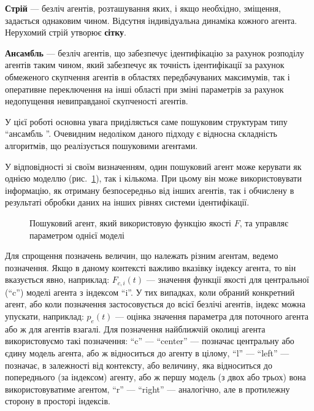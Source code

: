 \documentclass[a4paper,13pt]{atuaref}
\begin{document}
\textbf{Стрій} --- безліч агентів, розташування яких, і якщо необхідно,
зміщення, задається однаковим чином. Відсутня індивідуальна динаміка кожного
агента. Нерухомий стрій утворює \textbf{сітку}.

\textbf {Ансамбль} ---
безліч агентів, що забезпечує ідентифікацію за рахунок розподілу агентів таким
чином, який забезпечує як точність ідентифікації за рахунок обмеженого
скупчення агентів в областях передбачуваних максимумів, так і оперативне
переключення на інші області при зміні параметрів за рахунок недопущення
невиправданої скупченості агентів.

У цієї роботі основна увага приділяється саме пошуковим структурам типу
``ансамбль ''. Очевидним недоліком даного підходу є відносна складність
алгоритмів, що реалізується пошуковими агентами.

У відповідності зі своїм визначенням, один пошуковий агент може керувати як
однією моделлю (рис.~\ref{atu:f:agent1}), так і кількома. При цьому він
може використовувати інформацію, як отриману безпосередньо від інших агентів,
так і обчислену в результаті обробки даних на інших рівнях системи
ідентифікації.

\begin{figure}[htb!]
\begin{center}

\end{center}
\caption{Пошуковий агент, який використовую функцію якості $F$, та управляє параметром однієї моделі}
\label{atu:f:agent1}
\end{figure}

Для спрощення позначень величин, що належать різним агентам, ведемо
позначення. Якщо в даному контексті важливо вказівку індексу агента, то він
вказується явно, наприклад: $ F_{c, i} (t) $ --- значення функції якості для
центральної (``c'') моделі агента з індексом ``i''. У тих випадках, коли
обраний конкретний агент, або коли позначення застосовується до всієї безлічі
агентів, індекс можна упускати, наприклад: $ p_e (t) $
--- оцінка значення параметра для поточного агента або ж для агентів взагалі.
Для позначення найближчій околиці агента використовуємо такі позначення:
``c'' --- ``center'' --- позначає центральну або єдину модель агента, або ж
відноситься до агенту в цілому, ``l'' --- ``left'' --- позначає, в
залежності від контексту, або величину, яка відноситься до попереднього (за
індексом) агенту, або ж першу модель (з двох або трьох) вона використовуватиме
агентом, ``r'' --- ``right'' --- аналогічно, але в протилежну сторону в
просторі індексів.
\end{document}
